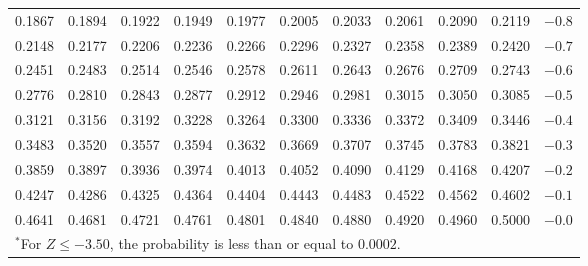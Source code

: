 \begin{table}[p]
\begin{center}
{\begin{tabular}{| rrrrr | rrrrr | c}
  \scriptsize{0.1867} & \scriptsize{0.1894} & \scriptsize{0.1922} & \scriptsize{0.1949} & \scriptsize{0.1977} & \scriptsize{0.2005} & \scriptsize{0.2033} & \scriptsize{0.2061} & \scriptsize{0.2090} & \scriptsize{0.2119} & $-0.8$ \\
  \scriptsize{0.2148} & \scriptsize{0.2177} & \scriptsize{0.2206} & \scriptsize{0.2236} & \scriptsize{0.2266} & \scriptsize{0.2296} & \scriptsize{0.2327} & \scriptsize{0.2358} & \scriptsize{0.2389} & \scriptsize{0.2420} & $-0.7$ \\
  \scriptsize{0.2451} & \scriptsize{0.2483} & \scriptsize{0.2514} & \scriptsize{0.2546} & \scriptsize{0.2578} & \scriptsize{0.2611} & \scriptsize{0.2643} & \scriptsize{0.2676} & \scriptsize{0.2709} & \scriptsize{0.2743} & $-0.6$ \\
  \scriptsize{0.2776} & \scriptsize{0.2810} & \scriptsize{0.2843} & \scriptsize{0.2877} & \scriptsize{0.2912} & \scriptsize{0.2946} & \scriptsize{0.2981} & \scriptsize{0.3015} & \scriptsize{0.3050} & \scriptsize{0.3085} & $-0.5$ \\
    \hline
  \scriptsize{0.3121} & \scriptsize{0.3156} & \scriptsize{0.3192} & \scriptsize{0.3228} & \scriptsize{0.3264} & \scriptsize{0.3300} & \scriptsize{0.3336} & \scriptsize{0.3372} & \scriptsize{0.3409} & \scriptsize{0.3446} & $-0.4$ \\
  \scriptsize{0.3483} & \scriptsize{0.3520} & \scriptsize{0.3557} & \scriptsize{0.3594} & \scriptsize{0.3632} & \scriptsize{0.3669} & \scriptsize{0.3707} & \scriptsize{0.3745} & \scriptsize{0.3783} & \scriptsize{0.3821} & $-0.3$ \\
  \scriptsize{0.3859} & \scriptsize{0.3897} & \scriptsize{0.3936} & \scriptsize{0.3974} & \scriptsize{0.4013} & \scriptsize{0.4052} & \scriptsize{0.4090} & \scriptsize{0.4129} & \scriptsize{0.4168} & \scriptsize{0.4207} & $-0.2$ \\
  \scriptsize{0.4247} & \scriptsize{0.4286} & \scriptsize{0.4325} & \scriptsize{0.4364} & \scriptsize{0.4404} & \scriptsize{0.4443} & \scriptsize{0.4483} & \scriptsize{0.4522} & \scriptsize{0.4562} & \scriptsize{0.4602} & $-0.1$ \\
  \scriptsize{0.4641} & \scriptsize{0.4681} & \scriptsize{0.4721} & \scriptsize{0.4761} & \scriptsize{0.4801} & \scriptsize{0.4840} & \scriptsize{0.4880} & \scriptsize{0.4920} & \scriptsize{0.4960} & \scriptsize{0.5000} & $-0.0$ \\
    \hline
\multicolumn{11}{l}{{\normalsize$^*$For $Z \leq -3.50$, the probability is less than or equal to $0.0002$.}}
\end{tabular}}
\end{center}
\end{table}

